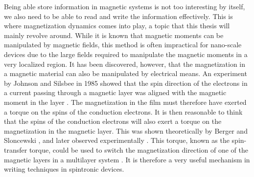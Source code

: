 Being able store information in magnetic systems is not too interesting by itself, we also need to be able to read and write the information effectively. This is where magnetization dynamics comes into play, a topic that this thesis will mainly revolve around. While it is known that magnetic moments can be manipulated by magnetic fields, this method is often impractical for nano-scale devices due to the large fields required to manipulate the magnetic moments in a very localized region. It has been discovered, however, that the magnetization in a magnetic material can also be manipulated by electrical means. An experiment by Johnson and Silsbee in 1985 showed that the spin direction of the electrons in a current passing through a magnetic layer was aligned with the magnetic moment in the layer \cite{JohnsonSilsbee1985}. The magnetization in the film must therefore have exerted a torque on the spins of the conduction electrons. It is then reasonable to think that the spins of the conduction electrons will also exert a torque on the magnetization in the magnetic layer. This was shown theoretically by Berger \cite{Berger1978,Berger1984,Berger1992,Berger1996} and Sloncewski \cite{Slonczewski1996}, and later observed experimentally \cite{Tsoi1998}. This torque, known as the spin-transfer torque, could be used to switch the magnetization direction of one of the magnetic layers in a multilayer system \cite{Myers1999,Sun1999,Katine2000}. It is therefore a very useful mechanism in writing techniques in spintronic devices. 

